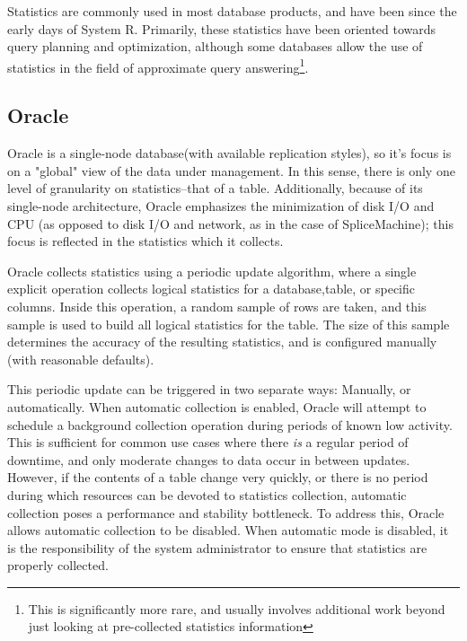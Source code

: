 Statistics are commonly used in most database products, and have been since the early days of System R. Primarily, these statistics have been oriented towards query planning and optimization, although some databases allow the use of statistics in the field of approximate query answering\footnote{This is significantly more rare, and usually involves additional work beyond just looking at pre-collected statistics information}. 

\subsection{Oracle}
Oracle is a single-node database(with available replication styles), so it's focus is on a "global" view of the data under management. In this sense, there is only one level of granularity on statistics--that of a table.  Additionally, because of its single-node architecture, Oracle emphasizes the minimization of disk I/O and CPU (as opposed to disk I/O and network, as in the case of SpliceMachine); this focus is reflected in the statistics which it collects.

Oracle collects statistics using a periodic update algorithm, where a single explicit operation collects logical statistics for a database,table, or specific columns. Inside this operation, a random sample of rows are taken, and this sample is used to build all logical statistics for the table. The size of this sample determines the accuracy of the resulting statistics, and is configured manually (with reasonable defaults).

This periodic update can be triggered in two separate ways: Manually, or automatically. When automatic collection is enabled, Oracle will attempt to schedule a background collection operation during periods of known low activity. This is sufficient for common use cases where there \emph{is} a regular period of downtime, and only moderate changes to data occur in between updates. However, if the contents of a table change very quickly, or there is no period during which resources can be devoted to statistics collection, automatic collection poses a performance and stability bottleneck. To address this, Oracle allows automatic collection to be disabled. When automatic mode is disabled, it is the responsibility of the system administrator to ensure that statistics are properly collected.

